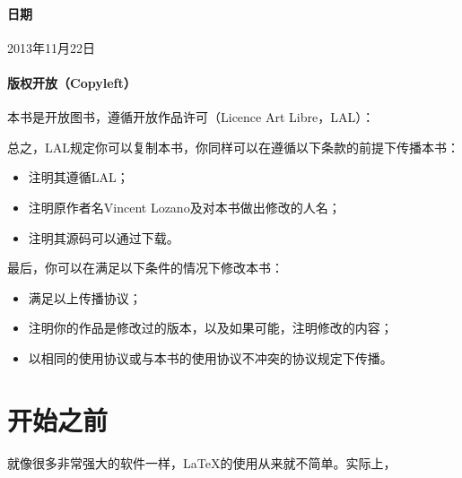 \paragraph*{日期}2013年11月22日
\paragraph*{版权开放（Copyleft）}本书是开放图书，遵循开放作品许可（Licence Art Libre，LAL）：


总之，LAL规定你可以复制本书，你同样可以在遵循以下条款的前提下传播本书：

\begin{itemize}
    \item 注明其遵循LAL；
    \item 注明原作者名Vincent Lozano及对本书做出修改的人名；
    \item 注明其源码可以通过下载。
\end{itemize}

最后，你可以在满足以下条件的情况下修改本书：

\begin{itemize}
    \item 满足以上传播协议；
    \item 注明你的作品是修改过的版本，以及如果可能，注明修改的内容；
    \item 以相同的使用协议或与本书的使用协议不冲突的协议规定下传播。
\end{itemize}

\section*{开始之前}

就像很多非常强大的软件一样，\LaTeX 的使用从来就不简单。实际上，